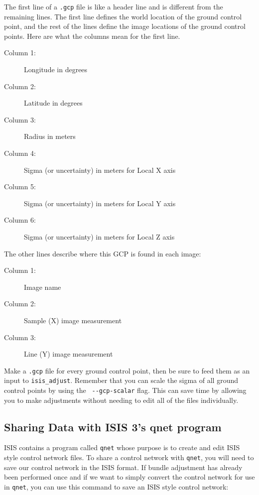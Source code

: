 The first line of a \texttt{.gcp} file is like a header line and
is different from the remaining lines.  The first line defines the
world location of the ground control point, and the rest of the
lines define the image locations of the ground control points. Here
are what the columns mean for the first line.

\begin{myindentpar}{2cm}
\begin{description}
  \item[Column 1:] Longitude in degrees
  \item[Column 2:] Latitude in degrees
  \item[Column 3:] Radius in meters
  \item[Column 4:] Sigma (or uncertainty) in meters for Local X axis
  \item[Column 5:] Sigma (or uncertainty) in meters for Local Y axis
  \item[Column 6:] Sigma (or uncertainty) in meters for Local Z axis
\end{description}
\end{myindentpar}

The other lines describe where this \ac{GCP} is found in each image:

\begin{myindentpar}{2cm}
\begin{description}
  \item[Column 1:] Image name
  \item[Column 2:] Sample (X) image measurement
  \item[Column 3:] Line (Y) image measurement
\end{description}
\end{myindentpar}

Make a {\tt .gcp} file for every ground control point, then be sure
to feed them as an input to {\tt isis\_adjust}. Remember that you
can scale the sigma of all ground control points by using the {\tt
-\/-gcp-scalar} flag. This can save time by allowing you to make
adjustments without needing to edit all of the files individually.

\subsection{Sharing Data with ISIS 3's qnet program}

\ac{ISIS} contains a program called \texttt{qnet} whose purpose is
to create and edit \ac{ISIS} style control network files. To share
a control network with \texttt{qnet}, you will need to save our
control network in the \ac{ISIS} format. If bundle adjustment has
already been performed once and if we want to simply convert the
control network for use in \texttt{qnet}, you can use this command
to save an \ac{ISIS} style control network:

